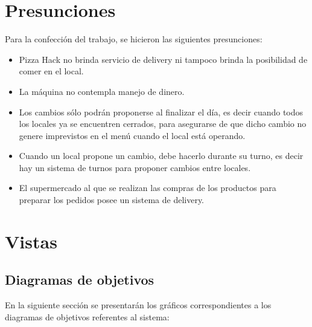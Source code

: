 \documentclass[a4paper,11pt] {article}
\begin{document}
\section*{Presunciones}

Para la confecci\'on del trabajo, se hicieron las siguientes presunciones:

\begin{itemize}
    \item Pizza Hack no brinda servicio de delivery ni tampoco brinda la posibilidad de comer en el local.
    \item La m\'aquina no contempla manejo de dinero.
    \item Los cambios s\'olo podr\'an proponerse al finalizar el d\'ia, es decir cuando todos los locales ya se encuentren cerrados, para asegurarse de que dicho cambio no genere imprevistos en el men\'u cuando el local est\'a operando.
		\item Cuando un local propone un cambio, debe hacerlo durante su turno, es decir hay un sistema de turnos para proponer cambios entre locales.
		\item El supermercado al que se realizan las compras de los productos para preparar los pedidos posee un sistema de delivery.
\end{itemize}

\section*{Vistas}

\subsection*{Diagramas de objetivos}

En la siguiente secci\'on se presentar\'an los gr\'aficos correspondientes a los diagramas de objetivos referentes al sistema: 
\end{document}
